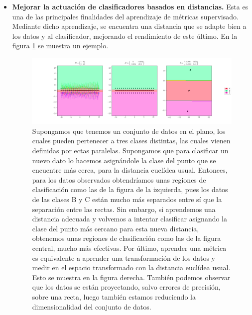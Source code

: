 \begin{itemize}
    \item \textbf{Mejorar la actuación de clasificadores basados en distancias.} Esta es una de las principales finalidades del aprendizaje de métricas supervisado. Mediante dicho aprendizaje, se encuentra una distancia que se adapte bien a los datos y al clasificador, mejorando el rendimiento de este último. En la figura \ref{fig:mejorar_knn} se muestra un ejemplo.

    \begin{figure}[h]
    \centering
    \includegraphics[width=21cm,center]{./images/ex_learning_nca.png}
    \caption{Supongamos que tenemos un conjunto de datos en el plano, los cuales pueden pertenecer a tres clases distintas, las cuales vienen definidas por ectas paralelas. Supongamos que para clasificar un nuevo dato lo hacemos asignándole la clase del punto que se encuentre más cerca, para la distancia euclídea usual. Entonces, para los datos observados obtendríamos unas regiones de clasificación como las de la figura de la izquierda, pues los datos de las clases B y C están mucho más separados entre sí que la separación entre las rectas. Sin embargo, si aprendemos una distancia adecuada y volvemos a intentar clasificar asignando la clase del punto más cercano para esta nueva distancia, obtenemos unas regiones de clasificación como las de la figura central, mucho más efectivas. Por último, aprender una métrica es equivalente a aprender una transformación de los datos y medir en el espacio transformado con la distancia euclídea usual. Esto se muestra en la figura derecha. También podemos observar que los datos se están proyectando, salvo errores de precisión, sobre una recta, luego también estamos reduciendo la dimensionalidad del conjunto de datos.} \label{fig:mejorar_knn}
    \end{figure}
    

\end{itemize}
